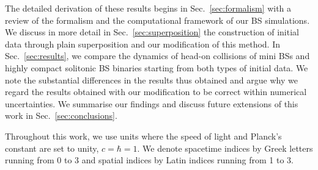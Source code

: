 \documentclass[]{iopart}
\begin{document}
The detailed derivation of these results begins
in Sec.~\ref{sec:formalism} with a review of
the formalism and the computational framework of our
BS simulations. We discuss in more detail
in Sec.~\ref{sec:superposition} the construction of initial
data through plain superposition and our modification of this
method. In Sec.~\ref{sec:results}, we compare the dynamics
of head-on collisions of mini BSs and highly compact solitonic BS
binaries starting from both types of initial data. We note
the substantial differences in the results thus obtained
and argue why we regard the results obtained with our
modification to be correct within numerical uncertainties.
We summarise our findings
and discuss future extensions of this work in
Sec.~\ref{sec:conclusions}.

Throughout this work, we use units where the speed of light and
Planck's constant are set to unity, $c=\hbar=1$. We denote
spacetime indices by Greek letters running from 0 to 3 and
spatial indices by Latin indices running from 1 to 3.
\end{document}
